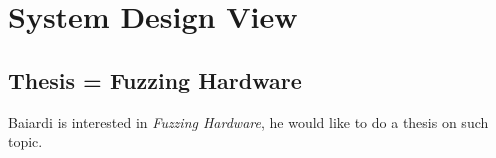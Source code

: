 \chapter{System Design View}


\section{Thesis = Fuzzing Hardware}
Baiardi is interested in \textit{Fuzzing Hardware},
he would like to do a thesis on such topic.
